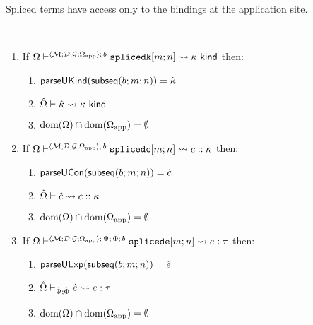 Spliced terms have access only to the bindings at the application site.
\begingroup
\def\thetheorem{\ref{thm:petsm-shadowing-prohibition}}
\begin{theorem}
~
\begin{enumerate}
\item If $\Omega \vdash^{\langle \mathcal{M}; \mathcal{D}; \mathcal{G}; \Omega_\text{app} \rangle;\,b} \texttt{splicedk}[m; n] \leadsto \kappa~\mathsf{kind}$ then:
  \begin{enumerate}
    \item $\mathsf{parseUKind}(\mathsf{subseq}(b; m; n))={\hat\kappa}$
    \item ${\hat\Omega} \vdash {\hat\kappa} \leadsto \kappa~\mathsf{kind}$
    \item $\text{dom}(\Omega) \cap \text{dom}(\Omega_\text{app}) = \emptyset$
  \end{enumerate}
\item If $\Omega \vdash^{\langle \mathcal{M}; \mathcal{D}; \mathcal{G}; \Omega_\text{app} \rangle;\,b} \texttt{splicedc}[m; n] \leadsto c :: \kappa$ then:
  \begin{enumerate}
    \item $\mathsf{parseUCon}(\mathsf{subseq}(b; m; n))={\hat c}$
    \item ${\hat\Omega} \vdash {\hat c} \leadsto c :: \kappa$
    \item $\text{dom}(\Omega) \cap \text{dom}(\Omega_\text{app}) = \emptyset$
  \end{enumerate}
\item If $\Omega \vdash^{\langle \mathcal{M}; \mathcal{D}; \mathcal{G}; \Omega_\text{app} \rangle;\,\hat{\Psi};\,\hat\Phi;\,b} \texttt{splicede}[m; n] \leadsto e : \tau$ then:
  \begin{enumerate}
    \item $\mathsf{parseUExp}(\mathsf{subseq}(b; m; n))={\hat e}$
    \item ${\hat\Omega} \vdash_{\hat{\Psi}; \hat\Phi} {\hat e} \leadsto e : \tau$
    \item $\text{dom}(\Omega) \cap \text{dom}(\Omega_\text{app}) = \emptyset$
  \end{enumerate}
\end{enumerate}
\end{theorem}
\endgroup
